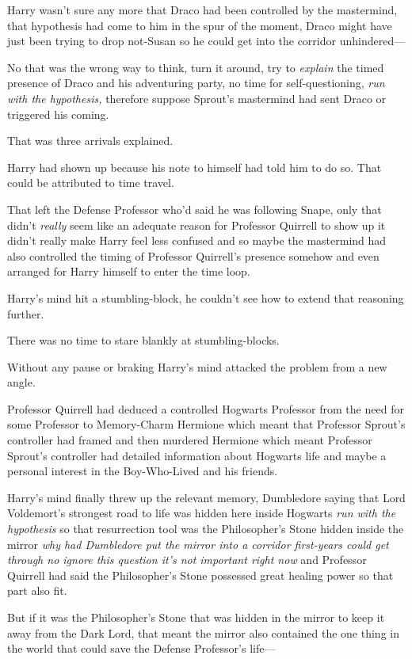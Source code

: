 Harry wasn't sure any more that Draco had been controlled by the mastermind, 
that hypothesis had come to him in the spur of the moment, Draco might have 
just been trying to drop not-Susan so he could get into the corridor unhindered---

No that was the wrong way to think, turn it around, try to \emph{explain} the 
timed presence of Draco and his adventuring party, no time for 
self-questioning, \emph{run with the hypothesis,} therefore suppose Sprout's 
mastermind had sent Draco or triggered his coming.

That was three arrivals explained.

Harry had shown up because his note to himself had told him to do so. That 
could be attributed to time travel.

That left the Defense Professor who'd said he was following Snape, only that 
didn't \emph{really} seem like an adequate reason for Professor Quirrell to 
show up it didn't really make Harry feel less confused and so maybe the 
mastermind had also controlled the timing of Professor Quirrell's presence 
somehow and even arranged for Harry himself to enter the time loop.

Harry's mind hit a stumbling-block, he couldn't see how to extend that 
reasoning further.

There was no time to stare blankly at stumbling-blocks.

Without any pause or braking Harry's mind attacked the problem from a new angle.

Professor Quirrell had deduced a controlled Hogwarts Professor from the need 
for some Professor to Memory-Charm Hermione which meant that Professor Sprout's 
controller had framed and then murdered Hermione which meant Professor Sprout's 
controller had detailed information about Hogwarts life and maybe a personal 
interest in the Boy-Who-Lived and his friends.

Harry's mind finally threw up the relevant memory, Dumbledore saying that Lord 
Voldemort's strongest road to life was hidden here inside Hogwarts \emph{run 
with the hypothesis} so that resurrection tool was the Philosopher's Stone 
hidden inside the mirror \emph{why had Dumbledore put the mirror into a 
corridor first-years could get through no ignore this question it's not 
important right now} and Professor Quirrell had said the Philosopher's Stone 
possessed great healing power so that part also fit.

But if it was the Philosopher's Stone that was hidden in the mirror to keep it 
away from the Dark Lord, that meant the mirror also contained the one thing in 
the world that could save the Defense Professor's life---

